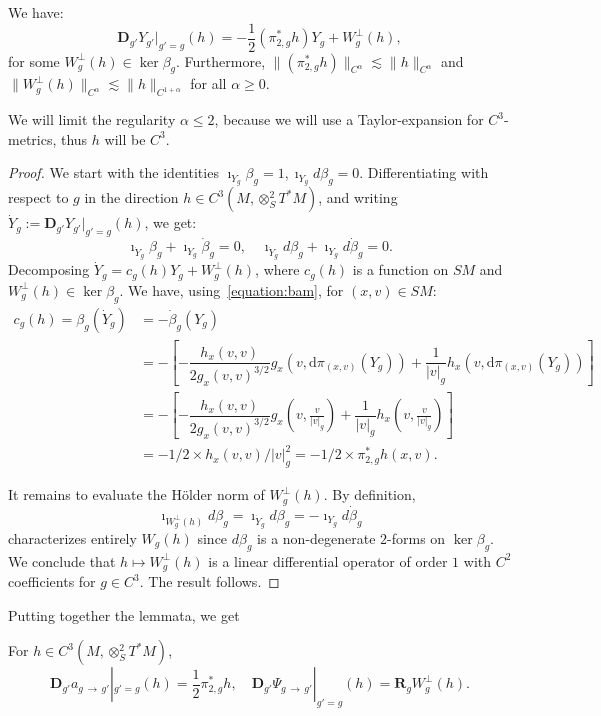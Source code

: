 \documentclass[AHL,Unicode,longabstracts,published]{cedram}
\newcommand{\RR}{\mathbf{R}}
\newcommand{\bdD}{\mathbf{D}}
\newcommand{\dd}{\mathrm{d}}
\begin{document}
\begin{lemm}\label{lemma:diff}
We have:
\[
\bdD_{g'} Y_{g'}|_{g'=g} (h) = -\frac{1}{2} \left(\pi_{2,g}^\ast h\right) Y_g + W_g^\perp(h),
\]
for some $W_g^\perp(h) \in \ker \beta_g$. Furthermore, $\|(\pi_{2,g}^\ast h)\|_{C^\alpha} \lesssim \|h\|_{C^\alpha}$ and $\|W_g^\perp(h)\|_{C^\alpha} \lesssim \|h\|_{C^{1+\alpha}}$ for all $\alpha \geq 0$.
\end{lemm}

We will limit the regularity $\alpha \leq 2$, because we will use a Taylor-expansion for $C^3$-metrics, thus $h$ will be $C^3$.

\begin{proof}
We start with the identities $\imath_{Y_g} \beta_g = 1, \imath_{Y_g} d \beta_g = 0$. Differentiating with respect to $g$ in the direction $h \in C^3(M,\otimes^2_S T^*M)$, and writing $\dot{Y}_g := \bdD_{g'} Y_{g'}|_{g'=g} (h)$, we get:
\[
\imath_{\dot{Y}_g} \beta_g + \imath_{Y_g} \dot{\beta}_g = 0,\quad\imath_{\dot{Y}_g} d \beta_g + \imath_{Y_g} d \dot{\beta}_g = 0.
\]
Decomposing $\dot{Y}_g = c_g(h)Y_g + W_g^\perp(h)$, where $c_g(h)$ is a function on $SM$ and $W_g^\perp(h) \in \ker \beta_g$. We have, using~\eqref{equation:bam}, for $(x,v) \in SM$:
\begin{align*}
c_g(h) = \beta_g(\dot{Y}_g) &= - \dot{\beta}_g(Y_g)\\
& =- \left[-\dfrac{h_x(v,v)}{2g_x(v,v)^{3/2}} g_x\left(v, \dd \pi_{(x,v)}(Y_g)\right) + \dfrac{1}{|v|_g} h_x\left(v, \dd \pi_{(x,v)}(Y_g)\right) \right]\\
& = - \left[-\dfrac{h_x(v,v)}{2g_x(v,v)^{3/2}} g_x\left(v, \frac{v}{|v|_g}\right) + \dfrac{1}{|v|_g} h_x\left(v, \frac{v}{|v|_g}\right) \right]\\
& = -1/2 \times h_x(v,v) /|v|_g^2 = -1/2 \times \pi_{2,g}^\ast h(x,v).
\end{align*}

It remains to evaluate the H\"older norm of $W^\perp_g(h)$. By definition,
\[
\imath_{W_g^\perp(h)} d \beta_g = \imath_{\dot{Y}_g} d \beta_g =- \imath_{Y_g} d \dot{\beta}_g
\]
characterizes entirely $W_g(h)$ since $d\beta_g$ is a non-degenerate $2$-forms on $\ker \beta_g$. We conclude that $h\mapsto W_g^\perp(h)$ is a linear differential operator of order $1$ with $C^2$ coefficients for $g\in C^3$. The result follows.
\end{proof}

Putting together the lemmata, we get
\begin{lemm}\label{lemma:derivative-0}
For $h\in C^3(M,\otimes^2_S T^\ast M)$,
\begin{equation}\label{eq:derivative-at-g-conjugation}
\bdD_{g'} a_{g\,\to\,g'}|_{g'=g}(h) = \frac{1}{2}\pi_{2,g}^\ast h,\quad \bdD_{g'} \Psi_{g\,\to\,g'}|_{g'=g}(h) = \RR_g W_g^\perp(h).
\end{equation}
\end{lemm}
\end{document}

